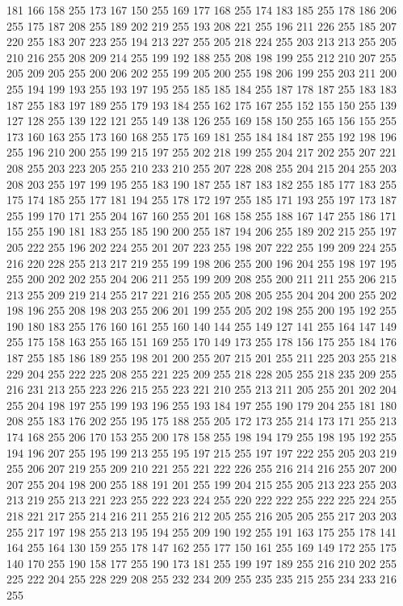 181 166 158 255 173 167 150 255 169 177 168 255 174 183 185 255 178 186 206 255 175 187 208 255 189 202 219 255 193 208 221 255 196 211 226 255 185 207 220 255 183 207 223 255 194 213 227 255 205 218 224 255 203 213 213 255 205 210 216 255 208 209 214 255
199 192 188 255 208 198 199 255 212 210 207 255 205 209 205 255 200 206 202 255 199 205 200 255 198 206 199 255 203 211 200 255 194 199 193 255 193 197 195 255 185 185 184 255 187 178 187 255 183 183 187 255 183 197 189 255 179 193 184 255 162 175 167 255
152 155 150 255 139 127 128 255 139 122 121 255 149 138 126 255 169 158 150 255 165 156 155 255 173 160 163 255 173 160 168 255 175 169 181 255 184 184 187 255 192 198 196 255 196 210 200 255 199 215 197 255 202 218 199 255 204 217 202 255 207 221 208 255
203 223 205 255 210 233 210 255 207 228 208 255 204 215 204 255 203 208 203 255 197 199 195 255 183 190 187 255 187 183 182 255 185 177 183 255 175 174 185 255 177 181 194 255 178 172 197 255 185 171 193 255 197 173 187 255 199 170 171 255 204 167 160 255
201 168 158 255 188 167 147 255 186 171 155 255 190 181 183 255 185 190 200 255 187 194 206 255 189 202 215 255 197 205 222 255 196 202 224 255 201 207 223 255 198 207 222 255 199 209 224 255 216 220 228 255 213 217 219 255 199 198 206 255 200 196 204 255
198 197 195 255 200 202 202 255 204 206 211 255 199 209 208 255 200 211 211 255 206 215 213 255 209 219 214 255 217 221 216 255 205 208 205 255 204 204 200 255 202 198 196 255 208 198 203 255 206 201 199 255 205 202 198 255 200 195 192 255 190 180 183 255
176 160 161 255 160 140 144 255 149 127 141 255 164 147 149 255 175 158 163 255 165 151 169 255 170 149 173 255 178 156 175 255 184 176 187 255 185 186 189 255 198 201 200 255 207 215 201 255 211 225 203 255 218 229 204 255 222 225 208 255 221 225 209 255
218 228 205 255 218 235 209 255 216 231 213 255 223 226 215 255 223 221 210 255 213 211 205 255 201 202 204 255 204 198 197 255 199 193 196 255 193 184 197 255 190 179 204 255 181 180 208 255 183 176 202 255 195 175 188 255 205 172 173 255 214 173 171 255
213 174 168 255 206 170 153 255 200 178 158 255 198 194 179 255 198 195 192 255 194 196 207 255 195 199 213 255 195 197 215 255 197 197 222 255 205 203 219 255 206 207 219 255 209 210 221 255 221 222 226 255 216 214 216 255 207 200 207 255 204 198 200 255
188 191 201 255 199 204 215 255 205 213 223 255 203 213 219 255 213 221 223 255 222 223 224 255 220 222 222 255 222 225 224 255 218 221 217 255 214 216 211 255 216 212 205 255 216 205 205 255 217 203 203 255 217 197 198 255 213 195 194 255 209 190 192 255
191 163 175 255 178 141 164 255 164 130 159 255 178 147 162 255 177 150 161 255 169 149 172 255 175 140 170 255 190 158 177 255 190 173 181 255 199 197 189 255 216 210 202 255 225 222 204 255 228 229 208 255 232 234 209 255 235 235 215 255 234 233 216 255
